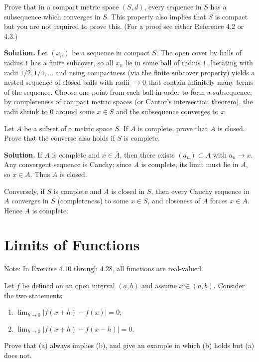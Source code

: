 \begin{problembox}
Prove that in a compact metric space $(S, d)$, every sequence in $S$ has a subsequence which converges in $S$. This property also implies that $S$ is compact but you are not required to prove this. (For a proof see either Reference 4.2 or 4.3.)
\end{problembox}

\noindent\textbf{Solution.}
Let $(x_n)$ be a sequence in compact $S$. The open cover by balls of radius $1$ has a finite subcover, so all $x_n$ lie in some ball of radius $1$. Iterating with radii $1/2,1/4,\dots$ and using compactness (via the finite subcover property) yields a nested sequence of closed balls with radii $\to 0$ that contain infinitely many terms of the sequence. Choose one point from each ball in order to form a subsequence; by completeness of compact metric spaces (or Cantor's intersection theorem), the radii shrink to $0$ around some $x\in S$ and the subsequence converges to $x$.
\medskip

\begin{problembox}
Let $A$ be a subset of a metric space $S$. If $A$ is complete, prove that $A$ is closed. Prove that the converse also holds if $S$ is complete.
\end{problembox}

\noindent\textbf{Solution.}
If $A$ is complete and $x\in\overline{A}$, then there exists $(a_n)\subset A$ with $a_n\to x$. Any convergent sequence is Cauchy; since $A$ is complete, its limit must lie in $A$, so $x\in A$. Thus $A$ is closed.

Conversely, if $S$ is complete and $A$ is closed in $S$, then every Cauchy sequence in $A$ converges in $S$ (completeness) to some $x\in S$, and closeness of $A$ forces $x\in A$. Hence $A$ is complete.
\medskip

\section{Limits of Functions}
Note: In Exercise 4.10 through 4.28, all functions are real-valued.

\begin{problembox}
Let $f$ be defined on an open interval $(a, b)$ and assume $x \in (a, b)$. Consider the two statements:
\begin{enumerate}[label=(\alph*)]
\item $\lim_{h \to 0} |f(x + h) - f(x)| = 0$;
\item $\lim_{h \to 0} |f(x + h) - f(x - h)| = 0$.
\end{enumerate}
Prove that (a) always implies (b), and give an example in which (b) holds but (a) does not.
\end{problembox}

